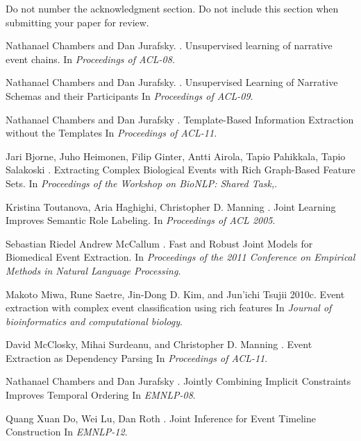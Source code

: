 \documentclass[11pt]{article}
\begin{document}
Do not number the acknowledgment section. Do not include this section when submitting your paper for review.

%
%
\begin{thebibliography}{}

Nathanael Chambers and Dan Jurafsky.
.
\newblock Unsupervised learning of narrative event chains.
\newblock In {\em Proceedings of ACL-08}.

Nathanael Chambers and Dan Jurafsky.
.
\newblock Unsupervised Learning of Narrative Schemas and their Participants
\newblock In {\em Proceedings of ACL-09}.

Nathanael Chambers and Dan Jurafsky
.
\newblock Template-Based Information Extraction without the Templates
\newblock In {\em Proceedings of ACL-11}.

Jari Bjorne, Juho Heimonen, Filip Ginter, Antti Airola, Tapio Pahikkala, Tapio Salakoski
.
\newblock Extracting Complex Biological Events with Rich Graph-Based Feature Sets.
\newblock In {\em Proceedings of the Workshop on BioNLP: Shared Task,}.

Kristina Toutanova, Aria Haghighi, Christopher D. Manning
.
\newblock Joint Learning Improves Semantic Role Labeling.
\newblock In {\em Proceedings of ACL 2005}.

Sebastian Riedel Andrew McCallum
.
\newblock Fast and Robust Joint Models for Biomedical Event Extraction.
\newblock In {\em Proceedings of the 2011 Conference on Empirical Methods in Natural Language Processing}.

Makoto Miwa, Rune Saetre, Jin-Dong D. Kim, and Jun’ichi Tsujii
\newblock 2010c.
\newblock Event extraction with complex event classification using rich features
\newblock In {\em Journal of bioinformatics and computational biology}.

David McClosky, Mihai Surdeanu, and Christopher D. Manning
.
\newblock Event Extraction as Dependency Parsing
\newblock In {\em Proceedings of ACL-11}.

Nathanael Chambers and Dan Jurafsky
.
\newblock Jointly Combining Implicit Constraints Improves Temporal Ordering
\newblock In {\em EMNLP-08}.

Quang Xuan Do, Wei Lu, Dan Roth
.
\newblock Joint Inference for Event Timeline Construction
\newblock In {\em EMNLP-12}.

\end{thebibliography}
\end{document}
